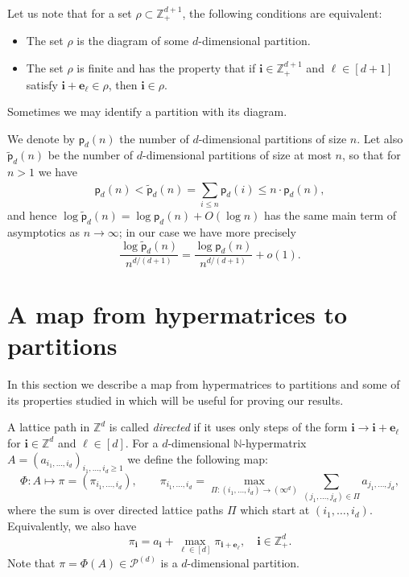 \documentclass[12pt]{amsart}
\theoremstyle{definition}
\theoremstyle{remark}
\begin{document}
Let us note that 
for a set $\rho \subset \mathbb{Z}^{d+1}_+$, the following conditions are equivalent:
\begin{itemize}
\item[(1)] The set $\rho$ is the diagram of some $d$-dimensional partition.
\item[(2)] The set $\rho$ is finite and has the property that if $\mathbf{i} \in \mathbb{Z}^{d+1}_+$  and $\ell \in [d+1]$ satisfy $\mathbf{i} + \mathbf{e}_{\ell} \in \rho$, then $\mathbf{i} \in \rho$. 
\end{itemize}
Sometimes we may identify a partition with its diagram. 

\vspace{0.5em}

We denote by $\mathsf{p}_d(n)$ the number of $d$-dimensional partitions of size $n$. Let also $\widetilde{\mathsf{p}}_d(n)$ be the number of $d$-dimensional partitions of size at most $n$, so that for $ n > 1$ we have
$$
\mathsf{p}_d(n) < \widetilde{\mathsf{p}}_d(n) = \sum_{i \le n}^{} \mathsf{p}_d(i) \le n\cdot \mathsf{p}_d(n),
$$
and hence $\log \widetilde{\mathsf{p}}_d(n) = \log \mathsf{p}_d(n) + O(\log n)$ 
has the same main term of asymptotics as $n \to \infty$; in our case we have more precisely
$$\frac{\log \widetilde{\mathsf{p}}_{d}(n)}{n^{d/(d+1)}} = \frac{\log \mathsf{p}_{d}(n)}{n^{d/(d+1)}} + o(1).$$ 

\section{A map from hypermatrices to partitions}\label{secphi}

In this section we describe a map from hypermatrices to partitions and some of its properties studied in \cite{ay} which will be useful for proving our results.

\vspace{0.5em}

A lattice path in $\mathbb{Z}^d$ is called {\it directed} if it uses only steps of the form $\mathbf{i} \to \mathbf{i} + \mathbf{e}_{\ell}$ for $\mathbf{i} \in \mathbb{Z}^d$ and $\ell \in [d]$. 
For a $d$-dimensional $\mathbb{N}$-hypermatrix $A = (a_{i_1, \ldots, i_d})_{i_1, \ldots, i_d \ge 1}$ we define the following map: 
$$\Phi : A \longmapsto \pi = (\pi_{i_1,\ldots, i_d}), \qquad \pi_{i_1,\ldots, i_d} = \max_{\Pi : (i_1,\ldots, i_d) \to (\infty^d)} \sum_{(j_1,\ldots, j_d)\in \Pi } a_{j_1,\ldots, j_d},$$
where the sum is over directed lattice paths $\Pi$ which start at $(i_1,\ldots, i_d)$. Equivalently, we also have 
$$
\pi_{\mathbf{i}} = a_{\mathbf{i}} + \max_{\ell \in [d]} \pi_{\mathbf{i} + \mathbf{e}_{\ell}}, \quad \mathbf{i} \in \mathbb{Z}_+^{d}.
$$
Note that 
$\pi = \Phi(A) \in \mathcal{P}^{(d)}$ is a $d$-dimensional partition.
\end{document}
